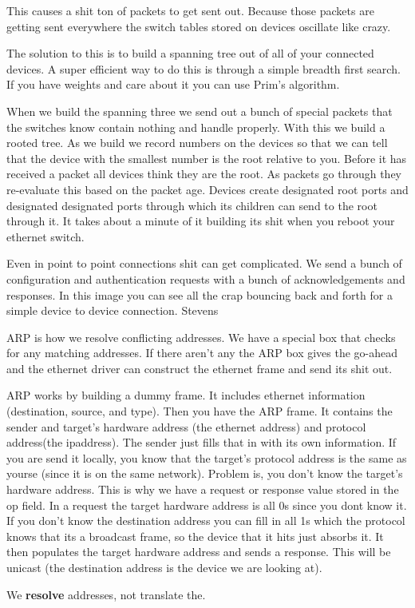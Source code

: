 \documentclass[12pt]{article}
\begin{document}

This causes a shit ton of packets to get sent out. Because those packets are getting sent everywhere the switch tables stored on devices oscillate like crazy.


The solution to this is to build a spanning tree out of all of your connected devices. A super efficient way to do this is through a simple breadth first search. If you have weights and care about it you can use Prim's algorithm.



When we build the spanning three we send out a bunch of special packets that the switches know contain nothing and handle properly. With this we build a rooted tree. As we build we record numbers on the devices so that we can tell that the device with the smallest number is the root relative to you. Before it has received a packet all devices think they are the root. As packets go through they re-evaluate this based on the packet age. Devices create designated root ports and designated designated ports through which its children can send to the root through it. It takes about a minute of it building its shit when you reboot your ethernet switch.




Even in point to point connections shit can get complicated. We send a bunch of configuration and authentication requests with a bunch of acknowledgements and responses. In this image you can see all the crap bouncing back and forth for a simple device to device connection.
Stevens

ARP is how we resolve conflicting addresses. We have a special box that checks for any matching addresses. If there aren't any the ARP box gives the go-ahead and the ethernet driver can construct the ethernet frame and send its shit out.

ARP works by building a dummy frame. It includes ethernet information (destination, source, and type). Then you have the ARP frame. It contains the sender and target's hardware address (the ethernet address) and protocol address(the ipaddress). The sender just fills that in with its own information. If you are send it locally, you know that the target's protocol address is the same as yourse (since it is on the same network). Problem is, you don't know the target's hardware address. This is why we have a request or response value stored in the op field. In a request the target hardware address is all 0s since you dont know it. If you don't know the destination address you can fill in all 1s which the protocol knows that its a broadcast frame, so the device that it hits just absorbs it. It then populates the target hardware address and sends a response. This will be unicast (the destination address is the device we are looking at).

We \textbf{resolve} addresses, not translate the.
\end{document}

